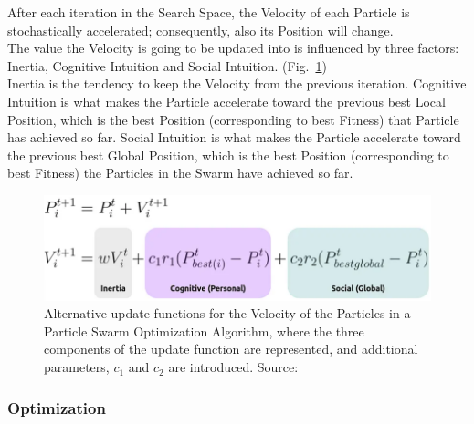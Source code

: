 After each iteration in the Search Space, the Velocity of each Particle is stochastically accelerated; consequently, also its Position will change.
\\[0.3cm]The value the Velocity is going to be updated into is influenced by three factors: Inertia, Cognitive Intuition and Social Intuition. (Fig.~\ref{fig:figure-3.1.2})
\\[0.3cm]Inertia is the tendency to keep the Velocity from the previous iteration.
Cognitive Intuition is what makes the Particle accelerate toward the previous best Local Position, which is the best Position (corresponding to best Fitness) that Particle has achieved so far.
Social Intuition is what makes the Particle accelerate toward the previous best Global Position, which is the best Position (corresponding to best Fitness) the Particles in the Swarm have achieved so far.
\begin{figure}[t]
	\centering
	\includegraphics[width=13cm]{figures/figure-3.1.2.png}
	\caption[Alternative Update Functions for PSO]{Alternative update functions for the Velocity of the Particles in a Particle Swarm Optimization Algorithm, where the three components of the update function are represented, and additional parameters, $c_1$ and $c_2$ are introduced. Source:~\cite{Tesi-3.2}}
	\label{fig:figure-3.1.2}
\end{figure}

\subsubsection{Optimization}

